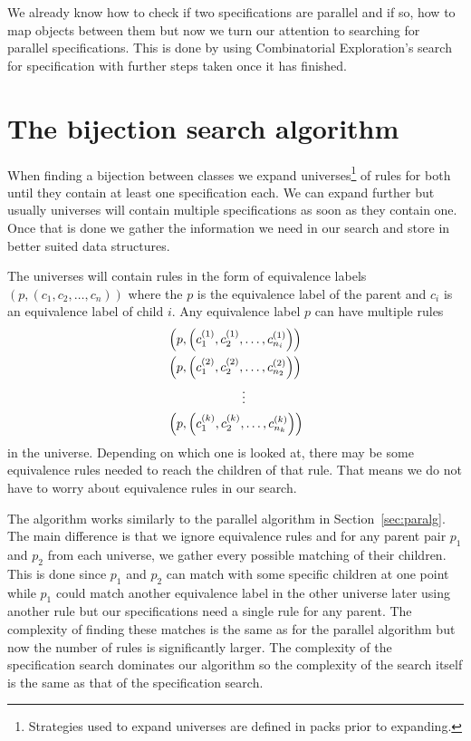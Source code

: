 \label{ch:search}
We already know how to check if two specifications are parallel and if so, how to map objects between them but now we turn our attention to searching for parallel specifications. This is done by using Combinatorial Exploration's search for specification with further steps taken once it has finished.

\section{The bijection search algorithm}
When finding a bijection between classes we expand universes\footnote{Strategies used to expand universes are defined in packs prior to expanding.} of rules for both until they contain at least one specification each. We can expand further but usually universes will contain multiple specifications as soon as they contain one. Once that is done we gather the information we need in our search and store in better suited data structures.

The universes will contain rules in the form of equivalence labels $(p, (c_1,c_2,\dotsc,c_n))$ where the $p$ is the equivalence label of the parent and $c_i$ is an equivalence label of child $i$. Any equivalence label $p$ can have multiple rules
\begin{align*}
    &\left(p, \left(c^{(1)}_1, c^{(1)}_2, \dotsc, c^{(1)}_{n_i}\right)\right)\\
    &\left(p, \left(c^{(2)}_1, c^{(2)}_2, \dotsc, c^{(2)}_{n_2}\right)\right)\\
    &\hspace{2.1cm}\vdots\\
    &\left(p, \left(c^{(k)}_1, c^{(k)}_2, \dotsc, c^{(k)}_{n_k}\right)\right)
\end{align*}
in the universe. Depending on which one is looked at, there may be some equivalence rules needed to reach the children of that rule. That means we do not have to worry about equivalence rules in our search.

The algorithm works similarly to the parallel algorithm in Section~\ref{sec:paralg}. The main difference is that we ignore equivalence rules and for any parent pair $p_1$ and $p_2$ from each universe, we gather every possible matching of their children. This is done since $p_1$ and $p_2$ can match with some specific children at one point while $p_1$ could match another equivalence label in the other universe later using another rule but our specifications need a single rule for any parent. The complexity of finding these matches is the same as for the parallel algorithm but now the number of rules is significantly larger. The complexity of the specification search dominates our algorithm so the complexity of the search itself is the same as that of the specification search.

